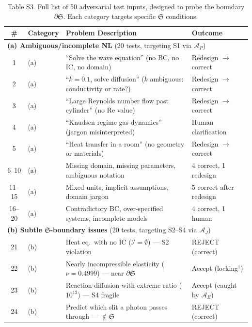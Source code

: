 \documentclass[11pt,a4paper]{article}
\newcommand{\Sclass}{\mathfrak{S}}
\newcommand{\Agent}{\mathcal{A}}
\begin{document}

\begin{table}[htbp]
\centering
\caption{Table S3. Full list of 50 adversarial test inputs, designed to probe the boundary $\partial \Sclass$. Each category targets specific $\Sclass$ conditions.}
\small
\begin{tabularx}{\textwidth}{clXl}
\toprule
\# & \textbf{Category} & \textbf{Problem Description} & \textbf{Outcome} \\
\midrule
\multicolumn{4}{l}{\textbf{(a) Ambiguous/incomplete NL} (20 tests, targeting S1 via $\Agent_P$)} \\
1 & (a) & ``Solve the wave equation'' (no BC, no IC, no domain) & Redesign $\to$ correct \\
2 & (a) & ``$k = 0.1$, solve diffusion'' ($k$ ambiguous: conductivity or rate?) & Redesign $\to$ correct \\
3 & (a) & ``Large Reynolds number flow past cylinder'' (no Re value) & Redesign $\to$ correct \\
4 & (a) & ``Knudsen regime gas dynamics'' (jargon misinterpreted) & Human clarification \\
5 & (a) & ``Heat transfer in a room'' (no geometry or materials) & Redesign $\to$ correct \\
6--10 & (a) & Missing domain, missing parameters, ambiguous notation & 4 correct, 1 redesign \\
11--15 & (a) & Mixed units, implicit assumptions, domain jargon & 5 correct after redesign \\
16--20 & (a) & Contradictory BC, over-specified systems, incomplete models & 4 correct, 1 human \\
\midrule
\multicolumn{4}{l}{\textbf{(b) Subtle $\Sclass$-boundary issues} (20 tests, targeting S2--S4 via $\Agent_J$)} \\
21 & (b) & Heat eq.\ with no IC ($\mathcal{I} = \emptyset$) --- S2 violation & REJECT (correct) \\
22 & (b) & Nearly incompressible elasticity ($\nu = 0.4999$) --- near $\partial \Sclass$ & Accept (locking$^\dagger$) \\
23 & (b) & Reaction-diffusion with extreme ratio ($10^{12}$) --- S4 fragile & Accept (caught by $\Agent_E$) \\
24 & (b) & Predict which slit a photon passes through --- $\notin \Sclass$ & REJECT (correct) \\

\end{tabularx}
\end{table}
\end{document}
